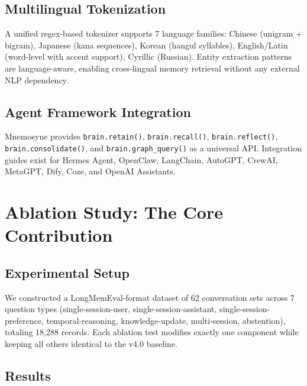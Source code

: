\documentclass[11pt,a4paper]{article}
\begin{document}
\subsection{Multilingual Tokenization}

A unified regex-based tokenizer supports 7 language families: Chinese (unigram + bigram), Japanese (kana sequences), Korean (hangul syllables), English/Latin (word-level with accent support), Cyrillic (Russian). Entity extraction patterns are language-aware, enabling cross-lingual memory retrieval without any external NLP dependency.

\subsection{Agent Framework Integration}

Mnemosyne provides \texttt{brain.retain()}, \texttt{brain.recall()},
\texttt{brain.reflect()}, \texttt{brain.consolidate()}, and
\texttt{brain.graph\_query()} as a universal API.
Integration guides exist for Hermes Agent, OpenClaw, LangChain,
AutoGPT, CrewAI, MetaGPT, Dify, Coze, and OpenAI Assistants.

\section{Ablation Study: The Core Contribution}

\subsection{Experimental Setup}

We constructed a LongMemEval-format dataset of 62 conversation sets across 7 question types (single-session-user, single-session-assistant, single-session-preference, temporal-reasoning, knowledge-update, multi-session, abstention), totaling 18,288 records. Each ablation test modifies exactly one component while keeping all others identical to the v4.0 baseline.

\subsection{Results}
\end{document}
